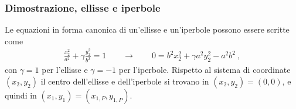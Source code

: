\documentclass[letterpaper,10pt,italian]{jupyterBook}
\begin{document}
\subsubsection*{Dimostrazione, ellisse e iperbole}

\sphinxAtStartPar
Le equazioni in forma canonica di un’ellisse e un’iperbole possono essere scritte come
\begin{equation*}
\begin{split}\frac{x_2^2}{a^2} + \gamma \frac{y_2^2}{b^2} = 1 \qquad \rightarrow \qquad 0 = b^2 x_2^2 + \gamma a^2 y_2^2 - a^2 b^2 \ ,\end{split}
\end{equation*}
\sphinxAtStartPar
con \(\gamma = 1\) per l’ellisse e \(\gamma = -1\) per l’iperbole. Rispetto al sistema di coordinate \((x_2, y_2)\) il centro dell’ellisse e dell’iperbole si trovano in \((x_2, y_2) = (0, 0)\), e quindi in \((x_1, y_1) = (x_{1,P}, y_{1,P})\).
\end{document}
